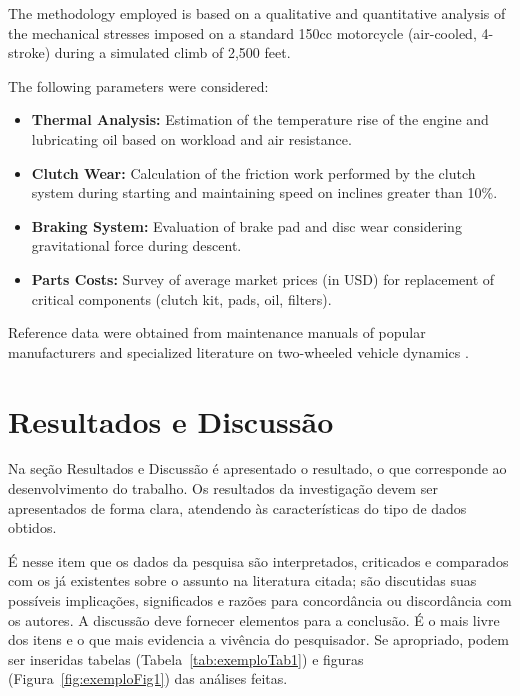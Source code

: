 \documentclass[12pt]{article}
\begin{document}
The methodology employed is based on a qualitative and quantitative analysis of the mechanical stresses imposed on a standard 150cc motorcycle (air-cooled, 4-stroke) during a simulated climb of 2,500 feet.

The following parameters were considered:
\begin{itemize}
    \item \textbf{Thermal Analysis:} Estimation of the temperature rise of the engine and lubricating oil based on workload and air resistance.
    \item \textbf{Clutch Wear:} Calculation of the friction work performed by the clutch system during starting and maintaining speed on inclines greater than 10\%.
    \item \textbf{Braking System:} Evaluation of brake pad and disc wear considering gravitational force during descent.
    \item \textbf{Parts Costs:} Survey of average market prices (in USD) for replacement of critical components (clutch kit, pads, oil, filters).
\end{itemize}

Reference data were obtained from maintenance manuals of popular manufacturers and specialized literature on two-wheeled vehicle dynamics \cite{kumar2022}.

\section{Resultados e Discussão}

Na seção Resultados e Discussão é apresentado o resultado, o que corresponde ao desenvolvimento do trabalho. Os resultados da investigação devem ser apresentados de forma clara, atendendo às características do tipo de dados obtidos. 

É nesse item que os dados da pesquisa são interpretados, criticados e comparados com os já existentes sobre o assunto na literatura citada; são discutidas suas possíveis implicações, significados e razões para concordância ou discordância com os autores. A discussão deve fornecer elementos para a conclusão. É o mais livre dos itens e o que mais evidencia a vivência do pesquisador. Se apropriado, podem ser inseridas tabelas (Tabela~\ref{tab:exemploTab1}) e figuras (Figura~\ref{fig:exemploFig1}) das análises feitas.
\end{document}
